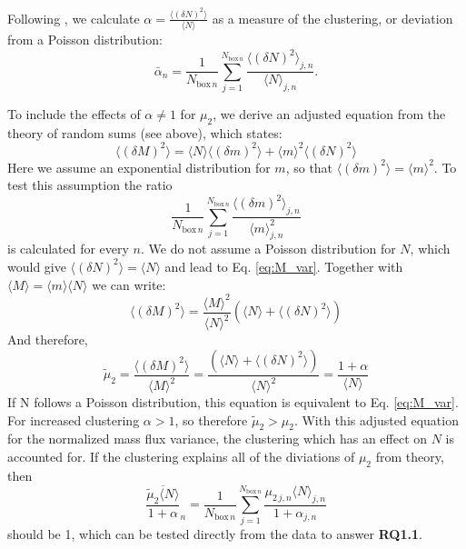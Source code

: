 \documentclass[a4paper, 12pt, draft]{article}
\begin{document}
Following \cite{Davoudi2010}, we calculate $\alpha = \frac{\langle (\delta N)^2 \rangle}{\langle N \rangle}$ as a measure of the clustering, or deviation from a Poisson distribution:
\begin{equation} \label{eq:mean_alpha}
 \bar{\alpha}_n = \frac{1}{N_{\mathrm{box}\,n}} \sum_{j=1}^{N_{\mathrm{box}\,n}} \frac{\langle (\delta N)^2 \rangle_{j,n}}{\langle N \rangle_{j,n}}.
\end{equation}

To include the effects of $\alpha \neq 1$ for $\mu_2$, we derive an adjusted equation from the theory of random sums (see above), which states:
\begin{equation} \label{eq:derivation_1}
 \langle (\delta M)^2 \rangle = \langle N \rangle \langle (\delta m)^2 \rangle + \langle m \rangle^2 \langle (\delta N)^2 \rangle
\end{equation}
Here we assume an exponential distribution for $m$, so that $\langle (\delta m)^2 \rangle = \langle m \rangle^2$. To test this assumption the ratio
\begin{equation} \label{eq:m_exp_test}
 \frac{1}{N_{\mathrm{box}\,n}} \sum_{j=1}^{N_{\mathrm{box}\,n}} \frac{\langle (\delta m)^2 \rangle_{j,n}}{\langle m \rangle_{j,n}^2}
\end{equation}
is calculated for every $n$. We do not assume a Poisson distribution for $N$, which would give $\langle (\delta N)^2 \rangle = \langle N \rangle$ and lead to Eq. \ref{eq:M_var}. Together with $\langle M \rangle = \langle m \rangle \langle N \rangle$ we can write:
\begin{equation} \label{eq:derivation_2}
 \langle (\delta M)^2 \rangle = \frac{\langle M \rangle^2}{\langle N \rangle^2} (\langle N \rangle + \langle (\delta N)^2 \rangle)
\end{equation}
And therefore,
\begin{equation} \label{eq:adjusted_M_var}
 \tilde{\mu}_2 = \frac{\langle (\delta M)^2 \rangle}{\langle M \rangle^2} = \frac{(\langle N \rangle + \langle (\delta N)^2 \rangle)}{\langle N \rangle^2 } = \frac{1+\alpha}{\langle N \rangle}
\end{equation}
If N follows a Poisson distribution, this equation is equivalent to Eq. \ref{eq:M_var}. For increased clustering $\alpha>1$, so therefore $\tilde{\mu}_2 > \mu_2$. With this adjusted equation for the normalized mass flux variance, the clustering which has an effect on $N$ is accounted for. If the clustering explains all of the diviations of $\mu_2$ from theory, then 
\begin{equation} \label{eq:adjusted_M_var}
 \overline{\frac{\tilde{\mu}_2 \langle N \rangle}{1+\alpha}}_n = \frac{1}{N_{\mathrm{box}\,n}} \sum_{j=1}^{N_{\mathrm{box}\,n}} \frac{\mu_{2\,j,n}\langle N\rangle_{j,n}}{1 + \alpha_{j,n}}
\end{equation} 
should be 1, which can be tested directly from the data to answer \textbf{RQ1.1}.
\end{document}
